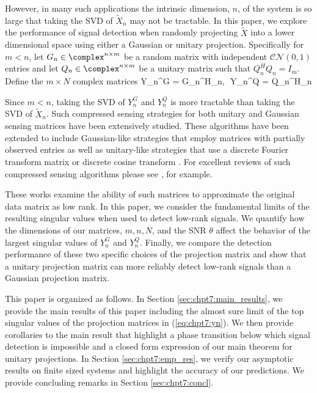 However, in many such applications the intrinsic dimension, $n$, of the system is so large
that taking the SVD of $\widetilde{X}_n$ may not be tractable. In this paper, we explore the
performance of signal detection when randomly projecting $\widetilde{X}$ into a lower
dimensional space using either a Gaussian or unitary projection. Specifically for $m<n$, let
$G_n\in\complex^{n\times m}$ be a random matrix with independent $\mathcal{CN}(0,1)$
entries and let $Q_n\in\complex^{n\times m}$ be a unitary matrix such that $Q_n^HQ_n=
I_m$. Define the $m\times N$ complex matrices
\beq\label{eq:chpt7:yn}
Y_n^G = G_n^H_n,\,\,\,\,Y_n^Q = Q_n^H_n
\eeq

Since $m<n$, taking the SVD of $Y_n^G$ and $Y_n^Q$ is more tractable than taking the SVD
of $\widetilde{X}_n$. Such compressed sensing strategies for both unitary
\cite{belabbas2007fast,gu1996efficient,rudelson2007sampling} and Gaussian
\cite{hehyperspectral,rokhlin2009randomized,halko2011algorithm} sensing matrices have been
extensively studied. These algorithms have been extended to include Gaussian-like
strategies that employ matrices with partially observed entries
\cite{achlioptas2007fast,arora2006fast} as well as unitary-like strategies that use a
discrete Fourier transform matrix \cite{liberty2007randomized} or discrete cosine transform
\cite{ramachandra2011compressive}. For excellent reviews of such compressed sensing
algorithms please see \cite{halko2011finding,candes2006near,donoho2006compressed}, for
example. 

These works examine the ability of such matrices to approximate the original data matrix
as low rank. In this paper, we consider the fundamental limits of the resulting singular
values when used to detect low-rank signals. We quantify how the dimensions of our
matrices, $m,n,N$, and the SNR $\theta$ affect the behavior of the largest singular values
of $Y_n^G$ and $Y_n^Q$. Finally, we compare the detection performance of these two
specific choices of the projection matrix and show that a unitary projection matrix can
more reliably detect low-rank signals than a Gaussian projection matrix.

This paper is organized as follows. In Section \ref{sec:chpt7:main_results}, we provide
the main results of this paper including the almost sure limit of the top singular values
of the projection matrices in (\ref{eq:chpt7:yn}). We then provide corollaries to the main
result that highlight a phase transition below which signal detection is impossible and a
closed form expression of our main theorem for unitary projections. In Section
\ref{sec:chpt7:emp_res}, we verify our asymptotic results on finite sized systems and
highlight the accuracy of our predictions. We provide concluding remarks in Section
\ref{sec:chpt7:concl}.

